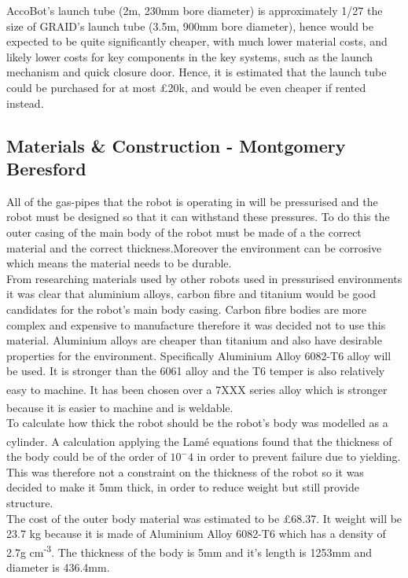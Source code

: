 \documentclass[11pt]{article}		%
\newcommand{\supercite}[1]{\textsuperscript{\cite{#1}}}		%
\begin{document}
    		\hspace*{3ex}AccoBot's launch tube (2m, 230mm bore diameter) is approximately 1/27 the size of GRAID's launch tube (3.5m, 900mm bore diameter), hence would be expected to be quite significantly cheaper, with much lower material costs, and likely lower costs for key components in the key systems, such as the launch mechanism and quick closure door. Hence, it is estimated that the launch tube could be purchased for at most £20k, and would be even cheaper if rented instead. 
    		

		\subsection[Materials \& Construction]{Materials \& Construction - Montgomery Beresford}
		
			
			All of the gas-pipes that the robot is operating in will be pressurised and the robot must be designed so that it can withstand these pressures. To do this the outer casing of the main body of the robot must be made of a the correct material and the correct thickness.Moreover the environment can be corrosive which means the material needs to be durable.
			\\ \hspace*{3ex}
		    From researching materials used by other robots used in pressurised environments it was clear that aluminium alloys, carbon fibre and titanium would be good candidates for the robot’s main body casing. Carbon fibre bodies are more complex and expensive to manufacture therefore it was decided not to use this material. Aluminium alloys are cheaper than titanium and also have desirable properties for the environment.
		    Specifically Aluminium Alloy 6082-T6 alloy will be used. It is stronger than the 6061 alloy and the T6 temper is also relatively easy to machine.\supercite{Aluminium_Alloys}  It has been chosen over a 7XXX series alloy which is stronger because it is easier to machine and is weldable. \supercite{Aluminium_Alloys_differences}
		    \\ \hspace*{3ex}
		   To calculate how thick the robot should be the robot's body was modelled as a cylinder. A calculation applying the Lamé equations \supercite{lame} found that the thickness of the body could be of the order of $10^-4$ in order to prevent failure due to yielding. This was therefore not a constraint on the thickness of the robot so it was decided to make it 5mm thick, in order to reduce weight but still provide structure.
		   \\ \hspace*{3ex}
		   The cost of the outer body material was estimated to be £68.37. It weight will be 23.7 kg because it is made of Aluminium Alloy 6082-T6 which has a density of 2.7g cm\textsuperscript{-3}. The thickness of the body is 5mm and it's length is 1253mm and diameter is 436.4mm.
		   
\end{document}
